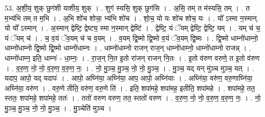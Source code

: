 \documentclass[17pt]{extarticle}
\begin{document}
53. अ॒शी॒य॒ शुक् छुग॑शी याशीय॒ शुक् । . शुग॑ स्यसि॒ शुक् छुग॑सि । . अ॒सि॒ तम् त म॑स्यसि॒ तम् । . त म॒भ्य॑भि तम् त म॒भि । . अ॒भि शो॑च शोचा॒ भ्य॑भि शो॑च । . शो॒च॒ यो यः शो॑च शोच॒ यः । . यो᳚ ऽस्मा न॒स्मान्. यो यो᳚ ऽस्मान् । . अ॒स्मान् द्वेष्टि॒ द्वेष्ट्य॒ स्मा न॒स्मान् द्वेष्टि॑ । . द्वेष्टि॒ यं ॅयम् द्वेष्टि॒ द्वेष्टि॒ यम् । . यम् च॑ च॒ यं ॅयम् च॑ । . च॒ व॒यं ॅव॒यम् च॑ च व॒यम् । . व॒यम् द्वि॒ष्मो द्वि॒ष्मो व॒यं ॅव॒यम् द्वि॒ष्मः । . द्वि॒ष्मो धाम्नो॑धाम्नो॒ धाम्नो॑धाम्नो द्वि॒ष्मो द्वि॒ष्मो धाम्नो॑धाम्नः । . धाम्नो॑धाम्नो राजन् राज॒न् धाम्नो॑धाम्नो॒ धाम्नो॑धाम्नो राजन्न् । . धाम्नो॑धाम्न॒ इति॒ धाम्नः॑ - धा॒म्नः॒ । . रा॒ज॒न् नि॒त इ॒तो रा॑जन् राजन् नि॒तः । . इ॒तो व॑रुण वरुणे॒ त इ॒तो व॑रुण । . व॒रु॒ण॒ नो॒ नो॒ व॒रु॒ण॒ व॒रु॒ण॒ नः॒ । . नो॒ मु॒ञ्च॒ मु॒ञ्च॒ नो॒ नो॒ मु॒ञ्च॒ । . मु॒ञ्च॒ यद् यन् मु॑ञ्च मुञ्च॒ यत् । . यदाप॒ आपो॒ यद् यदापः॑ । . आपो॒ अघ्नि॑या॒ अघ्नि॑या॒ आप॒ आपो॒ अघ्नि॑याः । . अघ्नि॑या॒ वरु॑ण॒ वरु॒णाघ्नि॑या॒ अघ्नि॑या॒ वरु॑ण । . वरु॒णे तीति॒ वरु॑ण॒ वरु॒णे ति॑ । . इति॒ शपा॑महे॒ शपा॑मह॒ इतीति॒ शपा॑महे । . शपा॑महे॒ तत॒ स्ततः॒ शपा॑महे॒ शपा॑महे॒ ततः॑ । . ततो॑ वरुण वरुण॒ तत॒ स्ततो॑ वरुण । . व॒रु॒ण॒ नो॒ नो॒ व॒रु॒ण॒ व॒रु॒ण॒ नः॒ । . नो॒ मु॒ञ्च॒ मु॒ञ्च॒ नो॒ नो॒ मु॒ञ्च॒ । . मु॒ञ्चेति॑ मुञ्च । \newline
\end{document}
